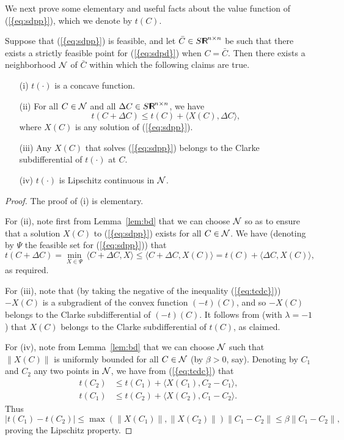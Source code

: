 \documentclass{siamltex}
\begin{document}
We next prove some elementary and useful facts about the value
function of {(\ref{{eq:sdpp}})}, which we denote by $t(C)$.
\begin{lemma} \label{lem:subdiff} Suppose that {(\ref{{eq:sdpp}})} is
  feasible, and let $\bar{C} \in S{\makebox{\sf I \hspace{-8.5 pt} R \hspace{-4.0pt}}}^{n \times n}$ be such that there
  exists a strictly feasible point for {(\ref{{eq:sdpd}})} when
  $C=\bar{C}$.  Then there exists a neighborhood ${{\cal N}}$ of $\bar{C}$
  within which the following claims are true.
\begin{itemize}
\item[(i)] $t(\cdot)$ is a concave function.
\item[(ii)] For all $C \in {{\cal N}}$ and all ${\Delta C} \in S {\makebox{\sf I \hspace{-8.5 pt} R \hspace{-4.0pt}}}^{n \times n}$,
  we have
\begin{equation} \label{eq:tcdc}
t(C + {\Delta C}) \le t(C) + \langle X(C), {\Delta C} \rangle,
\end{equation}
where $X(C)$ is any solution of {(\ref{{eq:sdpp}})}.
\item[(iii)] Any $X(C)$ that solves {(\ref{{eq:sdpp}})} belongs to the
  Clarke subdifferential of $t(\cdot)$ at $C$.
\item[(iv)] $t(\cdot)$ is Lipschitz continuous in ${{\cal N}}$.
\end{itemize}
\end{lemma}
\begin{proof}
The proof of (i) is elementary.

For (ii), note first from Lemma~\ref{lem:bd} that we can choose ${{\cal N}}$
so as to ensure that a solution $X(C)$ to {(\ref{{eq:sdpp}})} exists for
all $C \in {{\cal N}}$. We have (denoting by $\Psi$ the feasible set for
{(\ref{{eq:sdpp}})}) that
\[
t(C +{\Delta C}) = \min_{X \in \Psi} \, \langle C + {\Delta C}, X \rangle 
 \le \langle C + {\Delta C}, X(C) \rangle 
= t(C) + \langle {\Delta C}, X(C) \rangle,
\]
as required.

For (iii), note that (by taking the negative of the inequality
{(\ref{{eq:tcdc}})}) $-X(C)$ is a subgradient of the convex function
$(-t)(C)$, and so $-X(C)$ belongs to the Clarke subdifferential of
$(-t)(C)$. It follows from \cite[p.~128, Exercise 8(c)]{BorL00}
(with $\lambda=-1$) that $X(C)$ belongs to the Clarke subdifferential
of $t(C)$, as claimed.

For (iv), note from Lemma~\ref{lem:bd} that we can choose ${{\cal N}}$ such that
$\| X(C) \|$ is uniformly bounded for all $C \in {{\cal N}}$ (by $\beta>0$,
say). Denoting by $C_1$ and $C_2$ any two points in ${{\cal N}}$, we have
from {(\ref{{eq:tcdc}})} that
\begin{align*}
t(C_2) & \le t(C_1) + \langle X(C_1), C_2-C_1 \rangle, \\
t(C_1) & \le t(C_2) + \langle X(C_2), C_1-C_2 \rangle.
\end{align*}
Thus
\[
| t(C_1) - t(C_2) | \le \max \left( \| X(C_1) \|, \|X(C_2) \|
\right) \|C_1-C_2\| \le \beta \|C_1-C_2\|,
\]
proving the Lipschitz property.
\end{proof}
\end{document}
